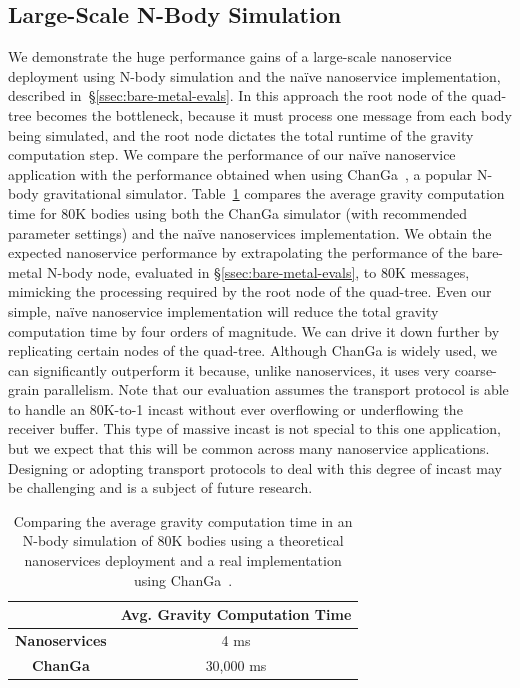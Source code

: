 
\subsection{Large-Scale N-Body Simulation}
\label{ssec:large-eval}
We demonstrate the huge performance gains of a large-scale nanoservice deployment using N-body simulation and the na\"ive nanoservice implementation, described in~\S\ref{ssec:bare-metal-evals}.
In this approach the root node of the quad-tree becomes the bottleneck, because it must process one message from each body being simulated, and the root node dictates the total runtime of the gravity computation step.
We compare the performance of our na\"ive nanoservice application with the performance obtained when using ChanGa~\cite{changa}, a popular N-body gravitational simulator.
Table~\ref{tab:nbody-changa} compares the average gravity computation time for 80K bodies using both the ChanGa simulator (with recommended parameter settings) and the na\"ive nanoservices implementation.
We obtain the expected nanoservice performance by extrapolating the performance of the \name{} bare-metal N-body node, evaluated in \S\ref{ssec:bare-metal-evals}, to 80K messages, mimicking the processing required by the root node of the quad-tree.
Even our simple, na\"ive nanoservice implementation will reduce the total gravity computation time by four orders of magnitude. We can drive it down further by replicating certain nodes of the quad-tree.
Although ChanGa is widely used, we can significantly outperform it because, unlike nanoservices, it uses very coarse-grain parallelism. Note that our evaluation assumes the transport protocol is able to handle an 80K-to-1 incast without ever overflowing or underflowing the receiver buffer.
This type of massive incast is not special to this one application, but we expect that this will be common across many nanoservice applications.
Designing or adopting transport protocols to deal with this degree of incast may be challenging and is a subject of future research.

\begin{table}
\begin{center}
\begin{tabular}{c|c}
                      & \textbf{Avg. Gravity Computation Time} \\ \toprule
\textbf{Nanoservices} & 4 ms                                   \\
\textbf{ChanGa}       & 30,000 ms                                 \\
\end{tabular}
\caption{Comparing the average gravity computation time in an N-body simulation of 80K bodies using a theoretical nanoservices deployment and a real implementation using ChanGa~\cite{changa}.}
\label{tab:nbody-changa}
\end{center}
\end{table}